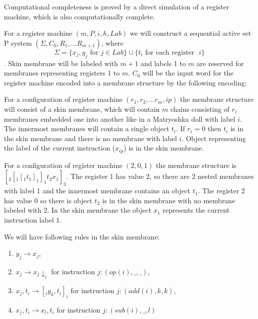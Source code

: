     \begin{dokaz}
      Computational completeness is proved by a direct simulation of a register machine, which is also computationally complete.

      For a register machine $(m,P,i,h,Lab)$ we will construct a sequential active set P system $(\Sigma, C_0, R_1, \ldots R_{m+1})$, where $$\Sigma = \{x_j, y_j \text{~for~} j\in Lab\}\cup\{t_i \text{~for each register ~}i\}$$. Skin membrane will be labeled with $m+1$ and labels 1 to $m$ are reserved for membranes representing registers 1 to $m$. $C_0$ will be the input word for the register machine encoded into a membrane structure by the following encoding: 

      For a configuration of register machine $(r_1, r_2, \ldots r_m, ip)$ the membrane structure will consist of a skin membrane, which will contain $m$ chains consisting of $r_i$ membranes embedded one into another like in a Matryoshka doll with label $i$. The innermost membranes will contain a single object $t_i$. If $r_i = 0$ then $t_i$ is in the skin membrane and there is no membrane with label $i$. Object representing the label of the current instruction ($x_{ip}$) is in the skin membrane.
      \begin{example}
        For a configuration of register machine $(2,0,1)$ the membrane structure is $[_3 [_1 [_1 t_1 ]_1 ]_1 t_2 x_1 ]_3$. The register 1 has value 2, so there are 2 nested membranes with label 1 and the innermost membrane contains an object $t_1$. The register 2 has value 0 so there is object $t_2$ is in the skin membrane with no membrane labeled with 2. In the skin membrane the object $x_1$ represents the current instruction label 1.
      \end{example}

      We will have following rules in the skin membrane:
      \begin{enumerate}
        \item\label{simple_skin_next_instruction} $y_j \rightarrow x_j$,
        \item\label{simple_skin_send_down} $x_j \rightarrow x_j\downarrow_{i}$ for instruction $j: (op(i), \_, \_)$,
        \item\label{simple_skin_create} $x_j, t_i \rightarrow [_i y_k, t_i ]_i$ for instruction $j: (add(i), k, k)$,
        \item\label{simple_skin_sub_empty} $x_j, t_i \rightarrow x_l, t_i$ for instruction $j: (sub(i), \_, l)$
      \end{enumerate}


\end{dokaz}
